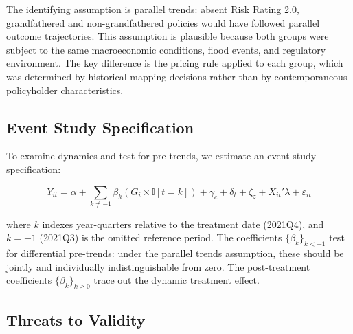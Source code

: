 \documentclass[12pt]{article}
\newcommand{\ind}{\mathbb{I}}
\begin{document}
The identifying assumption is parallel trends: absent Risk Rating 2.0, grandfathered and non-grandfathered policies would have followed parallel outcome trajectories. This assumption is plausible because both groups were subject to the same macroeconomic conditions, flood events, and regulatory environment. The key difference is the pricing rule applied to each group, which was determined by historical mapping decisions rather than by contemporaneous policyholder characteristics.

\subsection{Event Study Specification}

To examine dynamics and test for pre-trends, we estimate an event study specification:

\begin{equation}
\label{eq:eventstudy}
Y_{it} = \alpha + \sum_{k \neq -1} \beta_k (G_i \times \ind[t = k]) + \gamma_c + \delta_t + \zeta_z + X_{it}'\lambda + \varepsilon_{it}
\end{equation}

\noindent where $k$ indexes year-quarters relative to the treatment date (2021Q4), and $k = -1$ (2021Q3) is the omitted reference period. The coefficients $\{\beta_k\}_{k < -1}$ test for differential pre-trends: under the parallel trends assumption, these should be jointly and individually indistinguishable from zero. The post-treatment coefficients $\{\beta_k\}_{k \geq 0}$ trace out the dynamic treatment effect.

\subsection{Threats to Validity}
\end{document}

